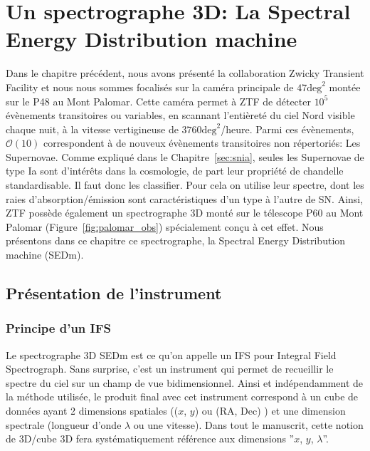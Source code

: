 \documentclass[../main/main.tex]{subfiles}
\begin{document}
\setcounter{chapter}{3}
\chapter{Un spectrographe 3D: La Spectral Energy Distribution machine}\label{ch:sedm}

\minitoc
\vspace{2cm}
Dans le chapitre précédent, nous avons présenté la collaboration Zwicky
Transient Facility et nous nous sommes focalisés sur la caméra
principale de $47\text{deg}^{2}$ montée sur le P48 au Mont
Palomar. Cette caméra permet à ZTF de détecter $10^{5}$ évènements
transitoires ou variables, en scannant l'entièreté du ciel Nord visible
chaque nuit,  à la vitesse
vertigineuse de $3760\text{deg}^{2}$/heure. Parmi ces évènements,
$\mathcal{O}(10)$ correspondent à de nouveux évènements transitoires non
répertoriés: Les Supernovae. Comme expliqué dans le
Chapitre~\ref{sec:snia}, seules les Supernovae de type Ia sont
d'intérêts dans la cosmologie, de part leur propriété de chandelle
standardisable. Il faut donc les classifier. Pour cela on utilise leur
spectre, dont les raies d'absorption/émission sont caractéristiques d'un
type à l'autre de SN. Ainsi, ZTF possède également un spectrographe 3D
monté sur le télescope P60 au Mont Palomar
(Figure~\ref{fig:palomar_obs}) spécialement conçu à cet effet. Nous
présentons dans ce chapitre ce spectrographe, la Spectral Energy
Distribution machine (SEDm).
\newpage

\section{Présentation de l'instrument}
\label{sec:ifs}

\subsection{Principe d'un IFS}
Le spectrographe 3D SEDm est ce qu'on appelle un IFS pour Integral Field
Spectrograph. Sans surprise, c'est un instrument qui permet de
recueillir le spectre du ciel sur un champ de vue bidimensionnel.
Ainsi et indépendamment de la méthode utilisée, le produit final avec
cet instrument correspond à
un cube de données ayant 2 dimensions spatiales (($x$, $y$) ou (RA,
Dec) ) et une dimension spectrale (longueur d'onde $\lambda$ ou une
vitesse). Dans tout le manuscrit, cette notion de 3D/cube 3D fera
systématiquement référence aux dimensions ''$x$, $y$, $\lambda$''.
\end{document}
